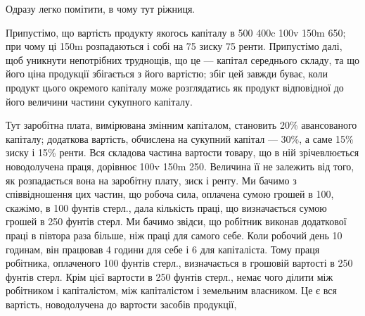 Одразу легко помітити, в чому тут ріжниця.

Припустімо, що вартість продукту якогось капіталу в 500 \deq{} 400c \dplus{}
100v \dplus{} 150m \deq{} 650; при чому ці 150m розпадаються і собі на 75 зиску \dplus{}
75 ренти. Припустімо далі, щоб уникнути непотрібних труднощів, що це —
капітал середнього складу, та що його ціна продукції збігається з його вартістю;
збіг цей завжди буває, коли продукт цього окремого капіталу може розглядатись
як продукт відповідної до його величини частини сукупного капіталу.

Тут заробітна плата, вимірювана змінним капіталом, становить 20\% авансованого
капіталу; додаткова вартість, обчислена на сукупний капітал — 30\%,
а саме 15\% зиску і 15\% ренти. Вся складова частина вартости товару, що
в ній зрічевлюється новодолучена праця, дорівнює 100v \dplus{} 150m \deq{} 250. Величина
її не залежить від того, як розпадається вона на заробітну плату, зиск і ренту.
Ми бачимо з співвідношення цих частин, що робоча сила, оплачена сумою
грошей в 100, скажімо, в 100 фунтів стерл., дала кількість праці, що визначається
сумою грошей в 250 фунтів стерл. Ми бачимо звідси, що робітник
виконав додаткової праці в півтора раза більше, ніж праці для самого себе.
Коли робочий день \deq{} 10 годинам, він працював 4 години для себе і 6 для
капіталіста. Тому праця робітника, оплаченого 100 фунтів стерл., визначається
в грошовій вартості в 250 фунтів стерл. Крім цієї вартости в 250 фунтів стерл.,
немає чого ділити між робітником і капіталістом, між капіталістом і земельним
власником. Це є вся вартість, новодолучена до вартости засобів продукції,
\parbreak{}  %
